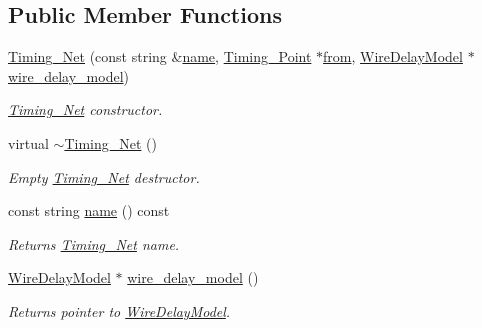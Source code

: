 \subsection*{Public Member Functions}
\begin{DoxyCompactItemize}
\item 
\hyperlink{classTiming__Analysis_1_1Timing__Net_aa31562b888cce5b1ad2a4198ad6c37d1}{Timing\-\_\-\-Net} (const string \&\hyperlink{classTiming__Analysis_1_1Timing__Net_aa21494aaaade42ab7578e697b9fc5d14}{name}, \hyperlink{classTiming__Analysis_1_1Timing__Point}{Timing\-\_\-\-Point} $\ast$\hyperlink{classTiming__Analysis_1_1Edge_a47020ea89fd9fde438adc814a731a23d}{from}, \hyperlink{classWireDelayModel}{Wire\-Delay\-Model} $\ast$\hyperlink{classTiming__Analysis_1_1Timing__Net_ac8cd484d33ccb714f2611a04dd653a66}{wire\-\_\-delay\-\_\-model})
\begin{DoxyCompactList}\small\item\em \hyperlink{classTiming__Analysis_1_1Timing__Net}{Timing\-\_\-\-Net} constructor. \end{DoxyCompactList}\item 
virtual \hyperlink{classTiming__Analysis_1_1Timing__Net_a919bdd9eb5b7d00b1c6b692bb34d6b6b}{$\sim$\-Timing\-\_\-\-Net} ()
\begin{DoxyCompactList}\small\item\em Empty \hyperlink{classTiming__Analysis_1_1Timing__Net}{Timing\-\_\-\-Net} destructor. \end{DoxyCompactList}\item 
const string \hyperlink{classTiming__Analysis_1_1Timing__Net_aa21494aaaade42ab7578e697b9fc5d14}{name} () const 
\begin{DoxyCompactList}\small\item\em Returns \hyperlink{classTiming__Analysis_1_1Timing__Net}{Timing\-\_\-\-Net} name. \end{DoxyCompactList}\item 
\hyperlink{classWireDelayModel}{Wire\-Delay\-Model} $\ast$ \hyperlink{classTiming__Analysis_1_1Timing__Net_ac8cd484d33ccb714f2611a04dd653a66}{wire\-\_\-delay\-\_\-model} ()
\begin{DoxyCompactList}\small\item\em Returns pointer to \hyperlink{classWireDelayModel}{Wire\-Delay\-Model}. \end{DoxyCompactList}\end{DoxyCompactItemize}

